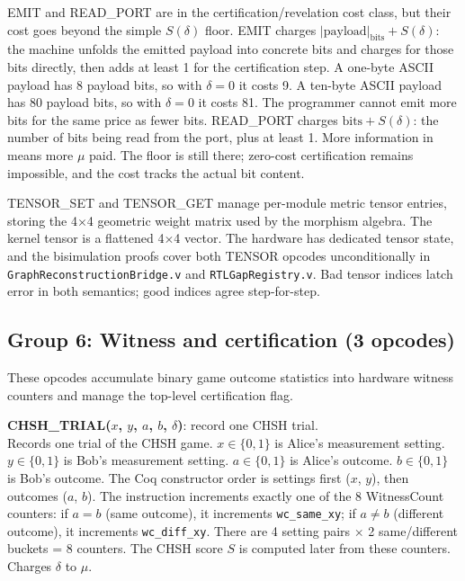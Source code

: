 \documentclass[11pt,a4paper]{article}
\theoremstyle{plain}
\theoremstyle{definition}
\theoremstyle{remark}
\begin{document}
EMIT and READ\_PORT are in the certification/revelation cost class, but their cost goes beyond the simple $S(\delta)$ floor. EMIT charges $|\text{payload}|_{\mathrm{bits}} + S(\delta)$: the machine unfolds the emitted payload into concrete bits and charges for those bits directly, then adds at least 1 for the certification step. A one-byte ASCII payload has 8 payload bits, so with $\delta = 0$ it costs 9. A ten-byte ASCII payload has 80 payload bits, so with $\delta = 0$ it costs 81. The programmer cannot emit more bits for the same price as fewer bits. READ\_PORT charges $\text{bits} + S(\delta)$: the number of bits being read from the port, plus at least 1. More information in means more $\mu$ paid. The floor is still there; zero-cost certification remains impossible, and the cost tracks the actual bit content.

TENSOR\_SET and TENSOR\_GET manage per-module metric tensor entries, storing the 4$\times$4 geometric weight matrix used by the morphism algebra. The kernel tensor is a flattened 4$\times$4 vector. The hardware has dedicated tensor state, and the bisimulation proofs cover both TENSOR opcodes unconditionally in \texttt{GraphReconstructionBridge.v} and \texttt{RTLGapRegistry.v}. Bad tensor indices latch error in both semantics; good indices agree step-for-step.

\subsection{Group 6: Witness and certification (3 opcodes)}

These opcodes accumulate binary game outcome statistics into hardware witness counters and manage the top-level certification flag.

\medskip
\noindent\textbf{CHSH\_TRIAL($x$, $y$, $a$, $b$, $\delta$)}: record one CHSH trial.\\
Records one trial of the CHSH game. $x \in \{0,1\}$ is Alice's measurement setting. $y \in \{0,1\}$ is Bob's measurement setting. $a \in \{0,1\}$ is Alice's outcome. $b \in \{0,1\}$ is Bob's outcome. The Coq constructor order is settings first ($x$, $y$), then outcomes ($a$, $b$). The instruction increments exactly one of the 8 WitnessCount counters: if $a = b$ (same outcome), it increments \texttt{wc\_same\_xy}; if $a \neq b$ (different outcome), it increments \texttt{wc\_diff\_xy}. There are 4 setting pairs $\times$ 2 same/different buckets = 8 counters. The CHSH score $S$ is computed later from these counters. Charges $\delta$ to $\mu$.
\end{document}
